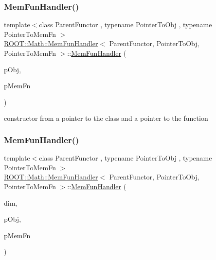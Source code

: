 \subsubsection{\texorpdfstring{MemFunHandler()}{MemFunHandler()}\hspace{0.1cm}{\footnotesize\ttfamily [5/6]}}
{\footnotesize\ttfamily template$<$class Parent\+Functor , typename Pointer\+To\+Obj , typename Pointer\+To\+Mem\+Fn $>$ \\
\mbox{\hyperlink{classROOT_1_1Math_1_1MemFunHandler}{R\+O\+O\+T\+::\+Math\+::\+Mem\+Fun\+Handler}}$<$ Parent\+Functor, Pointer\+To\+Obj, Pointer\+To\+Mem\+Fn $>$\+::\mbox{\hyperlink{classROOT_1_1Math_1_1MemFunHandler}{Mem\+Fun\+Handler}} (\begin{DoxyParamCaption}\item[{const Pointer\+To\+Obj \&}]{p\+Obj,  }\item[{Pointer\+To\+Mem\+Fn}]{p\+Mem\+Fn }\end{DoxyParamCaption})\hspace{0.3cm}{\ttfamily [inline]}}



constructor from a pointer to the class and a pointer to the function 

\mbox{\label{classROOT_1_1Math_1_1MemFunHandler_ae160c1f60f6681ba29ce9e2bf3654b24}} 
\subsubsection{\texorpdfstring{MemFunHandler()}{MemFunHandler()}\hspace{0.1cm}{\footnotesize\ttfamily [6/6]}}
{\footnotesize\ttfamily template$<$class Parent\+Functor , typename Pointer\+To\+Obj , typename Pointer\+To\+Mem\+Fn $>$ \\
\mbox{\hyperlink{classROOT_1_1Math_1_1MemFunHandler}{R\+O\+O\+T\+::\+Math\+::\+Mem\+Fun\+Handler}}$<$ Parent\+Functor, Pointer\+To\+Obj, Pointer\+To\+Mem\+Fn $>$\+::\mbox{\hyperlink{classROOT_1_1Math_1_1MemFunHandler}{Mem\+Fun\+Handler}} (\begin{DoxyParamCaption}\item[{unsigned int}]{dim,  }\item[{const Pointer\+To\+Obj \&}]{p\+Obj,  }\item[{Pointer\+To\+Mem\+Fn}]{p\+Mem\+Fn }\end{DoxyParamCaption})\hspace{0.3cm}{\ttfamily [inline]}}



